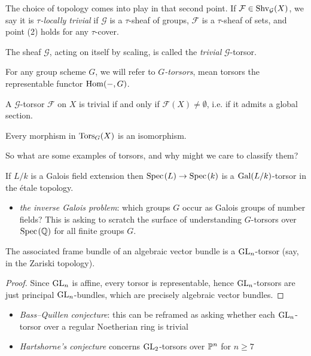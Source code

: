 \documentclass[11pt]{amsart}
\begin{document}
\begin{terminology} The choice of topology comes into play in that second point. If $\mathcal{F} \in \Shv_{\mathcal{G}}(X)$, we say it is $\tau$\textit{-locally trivial} if $\mathcal{G}$ is a $\tau$-sheaf of groups, $\mathcal{F}$ is a $\tau$-sheaf of sets, and point (2) holds for any $\tau$-cover.
\end{terminology}


\begin{example} The sheaf $\mathcal{G}$, acting on itself by scaling, is called the \textit{trivial} $\mathcal{G}$-torsor.
\end{example}

\begin{example} For any group scheme $G$, we will refer to $G$\textit{-torsors}, mean torsors the representable functor $\Hom(-,G)$.
\end{example}

\begin{proposition}\label{prop:torsor-trivial-iff-global-section} 
A $\mathcal{G}$-torsor $\mathcal{F}$ on $X$ is trivial if and only if $\mathcal{F}(X) \ne \emptyset$, i.e. if it admits a global section.
\end{proposition}



\begin{theorem} Every morphism in $\Tors_G(X)$ is an isomorphism.
\end{theorem}

So what are some examples of torsors, and why might we care to classify them?

\begin{example}\label{exa:galois-field-extn-torsor} 
If $L/k$ is a Galois field extension then $\Spec(L) \to \Spec(k)$ is a $\Gal(L/k)$-torsor in the \'etale topology.
\end{example}
\begin{itemize}
\item \textit{the inverse Galois problem}: which groups $G$ occur as Galois groups of number fields? This is asking to scratch the surface of understanding $G$-torsors over $\Spec(\Q)$ for all finite groups $G$.
\end{itemize}

\begin{example}
The associated frame bundle of an algebraic vector bundle is a $\GL_n$-torsor (say, in the Zariski topology).
\end{example}
\begin{proof} Since $\GL_n$ is affine, every torsor is representable, hence $\GL_n$-torsors are just principal $\GL_n$-bundles, which are precisely algebraic vector bundles.
\end{proof}
\begin{itemize}
    \item \textit{Bass--Quillen conjecture}: this can be reframed as asking whether each $\GL_n$-torsor over a regular Noetherian ring is trivial
    \item \textit{Hartshorne's conjecture} concerns $\GL_2$-torsors over $\P^n$ for $n\ge7$
\end{itemize}
\end{document}
